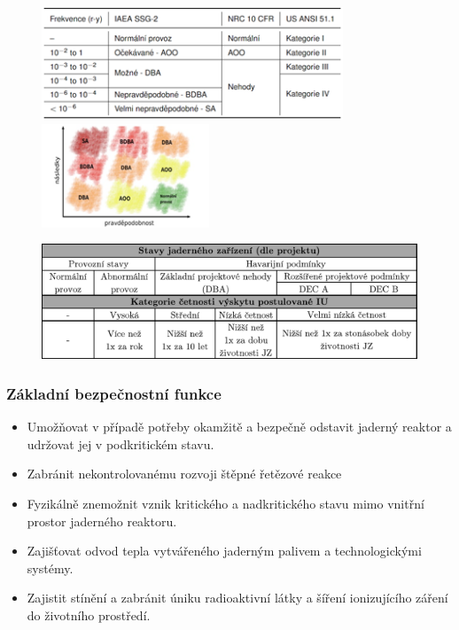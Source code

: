 \begin{figure}[h!]
    \centering
	\includegraphics[width=9cm]{img/jad-udalosti.png}
	\includegraphics[width=5cm]{img/jad-udalosti1.png}
\end{figure}

\begin{figure}[h!]
    \centering
    \includegraphics[width=\textwidth]{img/Stavy_JZ_cetnost.pdf}
\end{figure}

\subsubsection{Základní bezpečnostní funkce}

\begin{itemize}
    \item Umožňovat v případě potřeby okamžitě a bezpečně odstavit jaderný reaktor a udržovat jej v podkritickém stavu.
    \item Zabránit nekontrolovanému rozvoji štěpné řetězové reakce
    \item Fyzikálně znemožnit vznik kritického a nadkritického stavu mimo vnitřní prostor jaderného reaktoru.
    \item Zajišťovat odvod tepla vytvářeného jaderným palivem a technologickými systémy.
    \item Zajistit stínění a zabránit úniku radioaktivní látky a šíření ionizujícího záření do životního prostředí.
\end{itemize}

